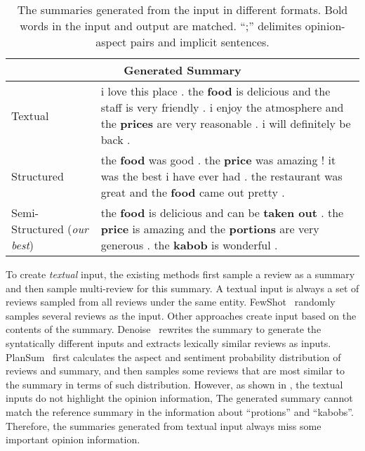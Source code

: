 \begin{table}[th]
	\begin{tabular}{|m{1.6cm}|m{6.1cm}|}
	\hline
	\multicolumn{2}{|c|}{\rule{0pt}{10pt} \bf Generated Summary}  \\	
	\hline
	Textual~\cite{Plansum20} & i love this place . the \textbf{food} is delicious and the staff is very friendly . i enjoy the atmosphere and the \textbf{prices} are very reasonable . i will definitely be back .
	\\
	\hline
	Structured~\cite{OpiDig20} & the \textbf{food} was good . the \textbf{price} was amazing ! it was the best i have ever had . the restaurant was great and the \textbf{food} came out pretty .
	\\
	\hline
	Semi-Structured ({\em our best})& the \textbf{food} is delicious and can be \textbf{taken out} . the \textbf{price} is amazing and the \textbf{portions} are very generous . the \textbf{kabob} is wonderful . \\
	\hline
\end{tabular}

	\caption{The summaries generated from the input in different formats. 
	Bold words in the input and output are matched.
	``;'' delimites opinion-aspect pairs and implicit sentences.
	}\label{tab:previous_data}  
\end{table}



To create {\em textual} input, the existing methods first sample
a review as a summary and then sample multi-review for this summary.
A textual input is always a set of reviews sampled from all reviews
under the same entity.
FewShot~\cite{Fewshot20}
randomly samples several reviews as the input.
Other approaches create input based on the contents of the summary. 
Denoise~\cite{Denoise20} rewrites the summary to generate the syntatically different inputs and 
extracts lexically similar reviews as inputs. 
PlanSum~\cite{Plansum20} first calculates the aspect and sentiment probability distribution of reviews and summary, and then samples some reviews that are most similar to the summary in terms of such distribution.
However, as shown in  , 
the textual inputs do not highlight the opinion information, 
The generated summary cannot match
the reference summary in the information about 
``protions'' and ``kabobs''.
Therefore, the summaries generated from textual input always
miss some important opinion information.

